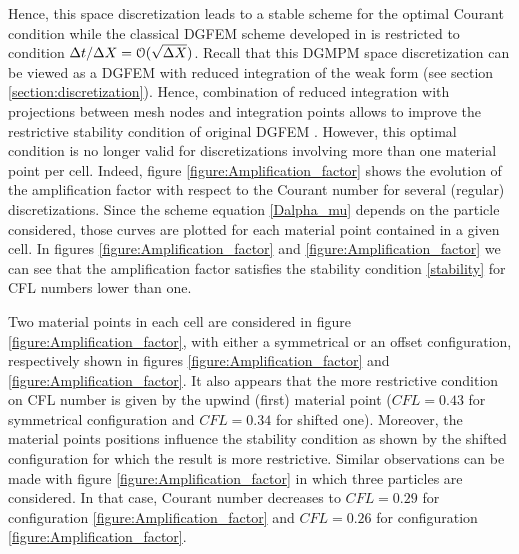 Hence, this space discretization leads to a stable scheme for the optimal Courant condition while the classical DGFEM scheme developed in \cite{Chavent_Salzano} is restricted to condition $\Delta t / \Delta X = \mathcal{O}(\sqrt{\Delta X})$. Recall that this DGMPM space discretization can be viewed as a DGFEM with reduced integration of the weak form (see section \ref{section:discretization}). Hence, combination of reduced integration with projections between mesh nodes and integration points allows to improve the restrictive stability condition of original DGFEM \cite{Chavent_Salzano,NeutronDG}. However, this optimal condition is no longer valid for discretizations involving more than one material point per cell. Indeed, figure \ref{figure:Amplification_factor} shows the evolution of the amplification factor with respect to the Courant number for several (regular) discretizations. Since the scheme equation \eqref{Dalpha_mu} depends on the particle considered, those curves are plotted for each material point contained in a given cell. In figures \ref{figure:Amplification_factor} and \ref{figure:Amplification_factor} we can see that the amplification factor satisfies the stability condition \eqref{stability} for CFL numbers lower than one.

Two material points in each cell are considered in figure \ref{figure:Amplification_factor}, with either a symmetrical or an offset configuration, respectively shown in figures \ref{figure:Amplification_factor} and \ref{figure:Amplification_factor}. It also appears that the more restrictive condition on CFL number is given by the upwind (first) material point ($CFL=0.43$ for symmetrical configuration and $CFL=0.34$ for shifted one). Moreover, the material points positions influence the stability condition as shown by the shifted configuration for which the result is more restrictive. Similar observations can be made with figure \ref{figure:Amplification_factor} in which three particles are considered. In that case, Courant number decreases to $CFL=0.29$ for configuration \ref{figure:Amplification_factor} and $CFL=0.26$ for configuration \ref{figure:Amplification_factor}. 

